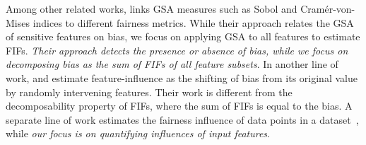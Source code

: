 
Among other related works, \cite{benesse2021fairness} links GSA measures such as Sobol and Cram{\'e}r-von-Mises indices to different fairness metrics. While their approach relates the GSA of sensitive features on bias, we focus on applying GSA to all features to estimate FIFs. \textit{Their approach detects the presence or absence of bias, while we focus on decomposing bias as the sum of FIFs of all feature subsets}. In another line of work, \cite{datta2016algorithmic} and \cite{ghosh2022algorithmic} estimate feature-influence as the shifting of bias from its original value by randomly intervening features. Their work is different from the decomposability property of FIFs, where the sum of FIFs is equal to the bias. A separate line of work estimates the fairness influence of data points in a dataset~\cite{li2022achieving,wang2022understanding}, while \textit{our focus is on quantifying influences of input features}.
